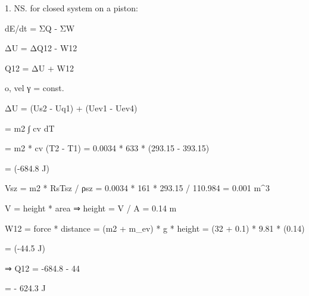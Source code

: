 1. NS. for closed system on a piston:

dE/dt = ΣQ - ΣW

ΔU = ΔQ12 - W12

Q12 = ΔU + W12

o, vel γ = const.

ΔU = (Us2 - Uq1) + (Uev1 - Uev4)

= m2 ∫ cv dT

= m2 * cv (T2 - T1) = 0.0034 * 633 * (293.15 - 393.15)

= (-684.8 J)

Vsz = m2 * RsTsz / ρsz = 0.0034 * 161 * 293.15 / 110.984 = 0.001 m^3

V = height * area ⇒ height = V / A = 0.14 m

W12 = force * distance = (m2 + m_ev) * g * height = (32 + 0.1) * 9.81 * (0.14)

= (-44.5 J)

⇒ Q12 = -684.8 - 44

= - 624.3 J